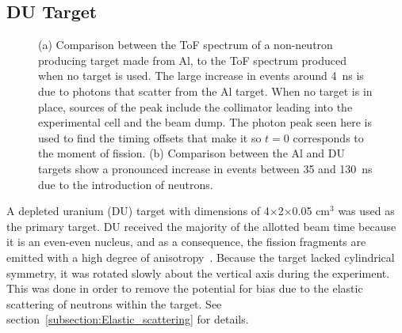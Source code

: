 \subsection{DU Target}
\label{subsection:targets}
\begin{figure}[]
\centering
    \caption{(a) Comparison between the ToF spectrum of a non-neutron producing target made from Al, to the ToF spectrum produced when no target is used.
    The large increase in events around 4~ns is due to photons that scatter from the Al target.
    When no target is in place, sources of the peak include the collimator leading into the experimental cell and the beam dump.
    The photon peak seen here is used to find the timing offsets that make it so $t=0$ corresponds to the moment of fission.
    (b) Comparison between the Al and DU targets show a pronounced increase in events between 35 and 130~ns due to the introduction of neutrons.}
    \label{fig:ToF}
\end{figure}
A depleted uranium (DU) target with dimensions of 4$\times$2$\times$0.05 $\text{cm}^3$ was used as the primary target.
DU received the majority of the allotted beam time because it is an even-even nucleus, and as a consequence, the fission fragments are emitted with a high degree of anisotropy~\cite{1977FragAss}.
Because the target lacked cylindrical symmetry, it was rotated slowly about the vertical axis during the experiment.
This was done in order to remove the potential for bias due to the elastic scattering of neutrons within the target.
See section~\ref{subsection:Elastic_scattering} for details.

